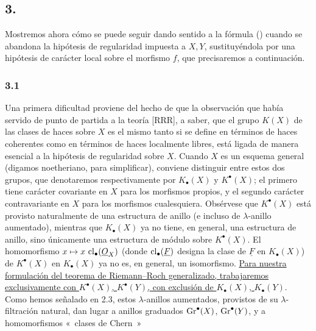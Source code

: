 
\subsection*{3.}
Mostremos ahora cómo se puede seguir dando sentido a la fórmula () cuando %
se abandona la hipótesis de regularidad impuesta a $X,Y$, sustituyéndola por
una hipótesis de carácter local sobre el morfismo $f$, que precisaremos a
continuación.

\subsubsection*{3.1}
Una primera dificultad proviene del hecho de que la observación que había
servido de punto de partida a la teoría [RRR], a saber, que el grupo $K(X)$
de las clases de haces sobre $X$ es el mismo tanto si se define en términos
de haces coherentes como en términos de haces localmente libres, está ligada
de manera esencial a la hipótesis de regularidad sobre $X$. Cuando $X$ es un
esquema general (digamos noetheriano, para simplificar), conviene distinguir
entre estos dos grupos, que denotaremos respectivamente por $K_\bullet(X)$ y
$K^\bullet(X)$; el primero tiene carácter covariante en $X$ para los
morfismos propios, y el segundo carácter contravariante en $X$ para los
morfismos cualesquiera. Obsérvese que $K^\bullet(X)$ está provisto
naturalmente de una estructura de anillo (e incluso de $\lambda$-anillo
aumentado), mientras que $K_\bullet(X)$ ya no tiene, en general, una
estructura de anillo, sino únicamente una estructura de módulo sobre
$K^\bullet(X)$. El homomorfismo
$x\mapsto x\,\operatorname{cl}_\bullet(\underline O_X)$ (donde
$\operatorname{cl}_\bullet(\underline F)$ designa la clase de $\underline F$ en
$K_\bullet(X)$) de $K^\bullet(X)$ en $K_\bullet(X)$ ya no es, en general,
un isomorfismo. \uline{Para nuestra formulación del teorema de
Riemann--Roch generalizado, trabajaremos exclusivamente con $K^\bullet(X)$,
$K^\bullet(Y)$, con exclusión de $K_\bullet(X)$, $K_\bullet(Y)$}. Como hemos
señalado en 2.3, estos $\lambda$-anillos aumentados, provistos de su
$\lambda$-filtración natural, dan lugar a anillos graduados
$\operatorname{Gr}^\bullet(X)$, $\operatorname{Gr}^\bullet(Y)$, y a homomorfismos «~clases de Chern~»
